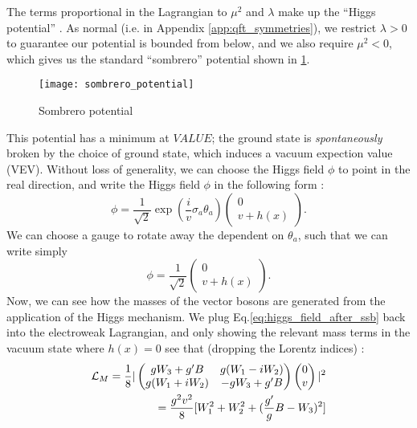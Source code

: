 The terms proportional in the Lagrangian to $\mu^2$ and $\lambda$ make up the ``Higgs potential'' .
As normal (i.e. in Appendix \ref{app:qft_symmetries}), we restrict $\lambda > 0$ to guarantee our potential is bounded from below, and we also require $\mu^2 < 0$, which gives us the standard ``sombrero'' potential shown in \ref{fig:sombrero}. 

\begin{figure} \label{fig:sombrero}
\caption{Sombrero potential}
\texttt{[image: sombrero\_potential]}
\end{figure}

This potential has a minimum at $VALUE$; the ground state is \textit{spontaneously} broken by the choice of ground state, which induces a vacuum expection value (VEV).
Without loss of generality, we can choose the Higgs field $\phi$ to point in the real direction, and write the Higgs field $\phi$ in the following form :
\begin{equation}
\phi = \frac{1}{\sqrt{2}} \exp( \frac{i}{v} \sigma_a \theta_a ) \begin{pmatrix} 0 \\ v + h(x) \end{pmatrix}.
\end{equation}
We can choose a gauge to rotate away the dependent on $\theta_a$, such that we can write simply
\begin{equation}
\label{eq:higgs_field_after_ssb}
\phi = \frac{1}{\sqrt{2}} \begin{pmatrix} 0 \\ v + h(x) \end{pmatrix}.
\end{equation}
Now, we can see how the masses of the vector bosons are generated from the application of the Higgs mechanism.
We plug Eq.\ref{eq:higgs_field_after_ssb} back into the electroweak Lagrangian, and only showing the relevant mass terms in the vacuum state where $h(x) = 0$  see that (dropping the Lorentz indices) :
\begin{equation}
\begin{aligned}
\mathcal{L}_M = \frac{1}{8} |\begin{pmatrix} gW_3 + g'B & g(W_1 - iW_2) \\ g(W_1 + iW_2) & -gW_3 + g'B \end{pmatrix}  \begin{pmatrix} 0 \\ v \end{pmatrix} |^2\\ = \frac{g^2 v^2}{8}[W_1^2 + W_2^2 + (\frac{g'}{g}B - W_3)^2]
\end{aligned}
\end{equation}

